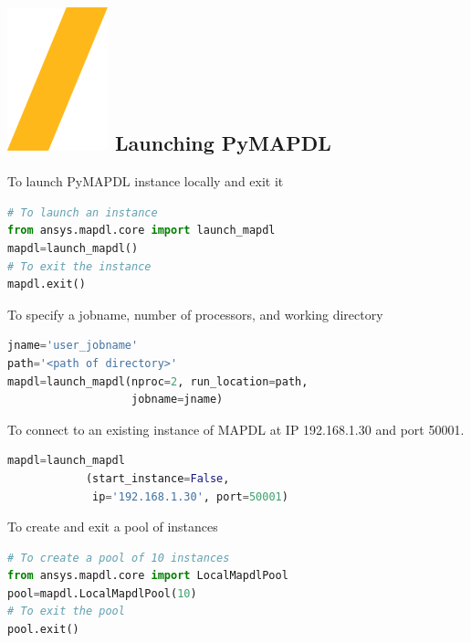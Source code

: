 \documentclass[9pt,landscape]{article}
\begin{document}
\begin{multicols}{3}
\setlength{\premulticols}{1pt}
\setlength{\postmulticols}{1pt}
\setlength{\multicolsep}{1pt}
\setlength{\columnsep}{2pt}

\section{\includegraphics[height=\fontcharht\font`\S]{slash.png} Launching PyMAPDL}
To launch PyMAPDL instance locally and exit it
\begin{lstlisting}[language=Python]
# To launch an instance
from ansys.mapdl.core import launch_mapdl
mapdl=launch_mapdl()
# To exit the instance
mapdl.exit()
\end{lstlisting}

To specify a jobname, number of processors, and working directory
\begin{lstlisting}[language=Python]
jname='user_jobname'
path='<path of directory>'
mapdl=launch_mapdl(nproc=2, run_location=path,
                   jobname=jname)
\end{lstlisting}

To connect to an existing instance of MAPDL at IP 192.168.1.30 and port 50001.
\begin{lstlisting}[language=Python]
mapdl=launch_mapdl
            (start_instance=False,
             ip='192.168.1.30', port=50001)
\end{lstlisting}
To create and exit a pool of instances
\begin{lstlisting}[language=Python]
# To create a pool of 10 instances
from ansys.mapdl.core import LocalMapdlPool
pool=mapdl.LocalMapdlPool(10)
# To exit the pool
pool.exit()
\end{lstlisting}


\end{multicols}
\end{document}
